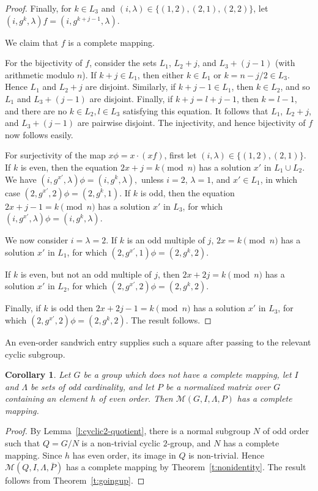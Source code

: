 \documentclass[11pt]{article}
\theoremstyle{plain}
\newtheorem{cor}[theorem]{Corollary}
\theoremstyle{remark}
\theoremstyle{definition}
\theoremstyle{plain}
\begin{document}
\begin{proof}
Finally, for $k\in L_3$ and $(i,\lambda)\in \{(1,2),(2,1),(2,2)\}$, let $(i,g^k,\lambda)f= (i, g^{k+j-1}, \lambda)$.

We claim that $f$ is a complete mapping.

For the bijectivity of $f$, consider the sets $L_1$, $L_2+j$, and $L_3+(j-1)$ (with arithmetic modulo $n$). If $k+j \in L_1$, then either $k\in L_1$ or $k=n-j/2\in L_3$. Hence $L_1$ and $L_2+j$ are disjoint.
Similarly, if $k+j-1 \in L_1$, then $k\in L_2$, and so $L_1$ and $L_3+(j-1)$ are disjoint. Finally, if $k+j=l+j-1$, then $k=l-1$, and there are no $k \in L_2, l \in L_3$ satisfying this equation. It follows that $L_1$, $L_2+j$, and $L_3+(j-1)$ are pairwise disjoint. The injectivity, and hence bijectivity of $f$ now follows easily.

For surjectivity of the map $x\phi=x\cdot (xf)$, first let $(i,\lambda)\in\{(1,2),(2,1)\}$. If $k$ is even, then the equation $2x+j=k\pmod n$ has a solution $x'$ in $L_1\cup L_2$. We have
\((i,g^{x'},\lambda)\phi=(i,g^k,\lambda),\)
unless $i=2$, $\lambda=1$, and $x'\in L_1$, in which case
\((2,g^{x'},2)\phi=(2,g^k,1).\)
If $k$ is odd, then the equation $2x+j-1=k\pmod n$ has a solution $x'$ in $L_3$, for which
\((i,g^{x'},\lambda)\phi=(i,g^k,\lambda).\)

We now consider $i=\lambda=2$. If $k$ is an odd multiple of $j$, $2x=k \pmod n$ has a solution $x'$ in $L_1$, for which $(2,g^{x'},1)\phi=(2,g^k,2)$.

 If $k$ is even, but not an odd multiple of $j$, then $2x+2j=k \pmod n$ has a solution $x'$ in $L_2$, for which $(2,g^{x'},2)\phi=(2,g^k,2)$.

 Finally, if $k$ is odd then $2x+2j-1=k \pmod n$ has a solution $x'$ in $L_3$, for which $(2,g^{x'},2)\phi=(2,g^k,2)$.
 The result follows.
\end{proof}

An even-order sandwich entry supplies such a square after passing to the relevant cyclic subgroup.

\begin{cor}\label{c:evenentry}
Let $G$ be a group which does not have a complete mapping, let $I$ and $\Lambda$ be sets of odd cardinality, and let $P$ be a normalized matrix over $G$ containing an element $h$ of even order. Then $\mathcal{M}(G,I,\Lambda,P)$ has a complete mapping.
\end{cor}
\begin{proof}
By Lemma~\ref{l:cyclic2-quotient}, there is a normal subgroup $N$ of odd order
such that $Q=G/N$ is a non-trivial cyclic $2$-group, and $N$ has a complete
mapping. Since $h$ has even order, its image in $Q$ is non-trivial. Hence
$\mathcal{M}(Q,I,\Lambda,\bar P)$ has a complete mapping by
Theorem~\ref{t:nonidentity}. The result follows from Theorem~\ref{t:goingup}.
\end{proof}
\end{document}
